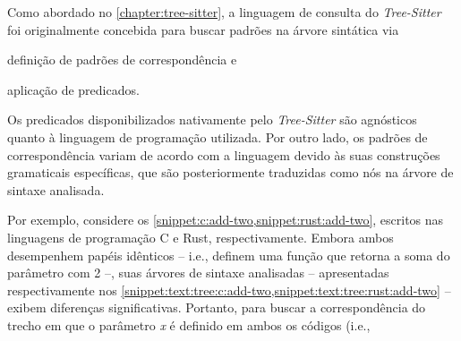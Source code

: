 \documentclass
  [11pt,a4paper,english,brazil,openright,sumario=tradicional,twoside]
  {abntex2}
\newcommand{\treesitter}{\textit{Tree-Sitter}\xspace}
\begin{document}
  Como abordado no \cref{chapter:tree-sitter}, a linguagem de consulta do
  \treesitter foi originalmente concebida para buscar padrões na árvore
  sintática via
  \begin{inparaenum}
    \item definição de padrões de correspondência e
    \item aplicação de predicados.
  \end{inparaenum}
  Os predicados disponibilizados nativamente pelo \treesitter são agnósticos
  quanto à linguagem de programação utilizada. Por outro lado, os padrões de
  correspondência variam de acordo com a linguagem devido às suas construções
  gramaticais específicas, que são posteriormente traduzidas como nós na árvore
  de sintaxe analisada.

  Por exemplo, considere os \cref{snippet:c:add-two,snippet:rust:add-two},
  escritos nas linguagens de programação C e Rust, respectivamente. Embora
  ambos desempenhem papéis idênticos -- i.e., definem uma função que retorna a
  soma do parâmetro  com 2 --, suas árvores de sintaxe
  analisadas -- apresentadas respectivamente nos
  \cref{snippet:text:tree:c:add-two,snippet:text:tree:rust:add-two} -- exibem
  diferenças significativas. Portanto, para buscar a correspondência do trecho
  em que o parâmetro \textit{x} é definido em ambos os códigos (i.e.,
  \codesnippetinline
    [c]
\end{document}

